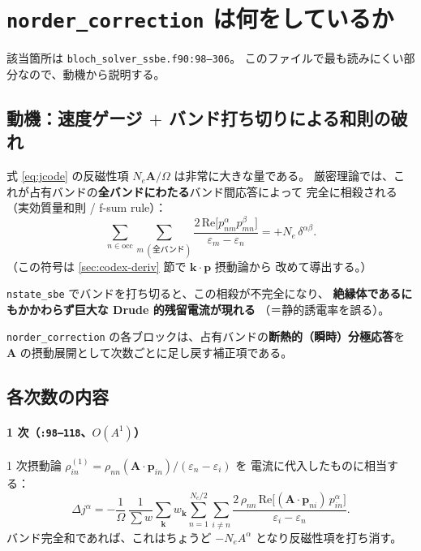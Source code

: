 \documentclass[dvipdfmx,a4paper,11pt]{jsarticle}
\newcommand{\file}[1]{\texttt{#1}}
\newcommand{\vk}{\bm{k}}
\newcommand{\vA}{\bm{A}}
\newcommand{\vp}{\bm{p}}
\newcommand{\Real}{\mathrm{Re}}
\newcommand{\eps}{\varepsilon}
\begin{document}
\section{\texttt{norder\_correction} は何をしているか}
\label{sec:norder}

該当箇所は \file{bloch\_solver\_ssbe.f90:98--306}。
このファイルで最も読みにくい部分なので、動機から説明する。

\subsection{動機：速度ゲージ $+$ バンド打ち切りによる和則の破れ}

式 \eqref{eq:jcode} の反磁性項 $N_e \vA/\Omega$ は非常に大きな量である。
厳密理論では、これが占有バンドの\textbf{全バンドにわたる}バンド間応答によって
完全に相殺される（実効質量和則 / f-sum rule）：
%
\begin{equation}
  \sum_{n \in \mathrm{occ}} \sum_{m\ (\text{全バンド})}
  \frac{2\,\Real\bigl[p^\alpha_{nm} p^\beta_{mn}\bigr]}{\eps_m - \eps_n}
  = +N_e\,\delta^{\alpha\beta}.
  \label{eq:fsum}
\end{equation}
%
（この符号は \ref{sec:codex-deriv} 節で $\vk\cdot\vp$ 摂動論から
改めて導出する。）

\file{nstate\_sbe} でバンドを打ち切ると、この相殺が不完全になり、
\textbf{絶縁体であるにもかかわらず巨大な Drude 的残留電流が現れる}
（＝静的誘電率を誤る）。

\file{norder\_correction} の各ブロックは、占有バンドの\textbf{断熱的（瞬時）分極応答}を
$\vA$ の摂動展開として次数ごとに足し戻す補正項である。

\subsection{各次数の内容}

\paragraph{1 次（\file{:98--118}、$O(A^1)$）}
1 次摂動論 $\rho^{(1)}_{in} = \rho_{nn}(\vA\cdot\vp_{in})/(\eps_n - \eps_i)$ を
電流に代入したものに相当する：
%
\begin{equation}
  \Delta j^\alpha
  = -\frac{1}{\Omega}\,\frac{1}{\sum w}
    \sum_{\vk} w_{\vk}
    \sum_{n=1}^{N_e/2} \sum_{i \neq n}
    \frac{2\,\rho_{nn}\,\Real\bigl[(\vA\cdot\vp_{ni})\,p^\alpha_{in}\bigr]}
         {\eps_i - \eps_n}.
  \label{eq:corr1}
\end{equation}
%
バンド完全和であれば、これはちょうど $-N_e A^\alpha$ となり反磁性項を打ち消す。
\end{document}
